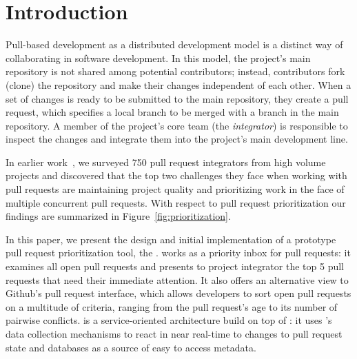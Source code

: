 \documentclass[conference]{IEEEtran}
\begin{document}



\section{Introduction}

Pull-based development as a distributed development model is a distinct way of
collaborating in software development. In this model, the project's main
repository is not shared among potential contributors; instead, contributors
fork (clone) the repository and make their changes independent of each other.
When a set of changes is ready to be submitted to the main repository, they
create a pull request, which specifies a local branch to be merged with a branch
in the main repository. A member of the project's core team (the
\emph{integrator}) is responsible to inspect the changes and integrate them into
the project's main development line.

In earlier work~\cite{GZSD15}, we surveyed 750 pull request integrators from high
volume projects and discovered that the top two challenges they face when
working with pull requests are maintaining project quality and prioritizing work
in the face of multiple concurrent pull requests. With respect to pull request
prioritization our findings are summarized in Figure~\ref{fig:prioritization}.

In this paper, we present the design and initial implementation of a prototype
pull request prioritization tool, the \prioritizer. \prioritizer works as a
priority inbox for pull requests: it examines all open pull requests and
presents to project integrator the top 5 pull requests that need their immediate
attention. It also offers an alternative view to Github's pull request
interface, which allows developers to sort open pull requests on a multitude of
criteria, ranging from the pull request's age to its number of pairwise
conflicts. \prioritizer is a service-oriented architecture build on top of
\ghtorrent: it uses \ghtorrent's data collection mechanisms to react in near
real-time to changes to pull request state and databases as a source of easy to
access metadata.
\end{document}
